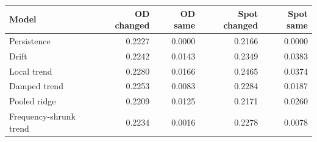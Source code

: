 \begin{tabular}{lrrrr}
\toprule
Model & OD changed & OD same & Spot changed & Spot same \\
\midrule
Persistence & 0.2227 & 0.0000 & 0.2166 & 0.0000 \\
Drift & 0.2242 & 0.0143 & 0.2349 & 0.0383 \\
Local trend & 0.2280 & 0.0166 & 0.2465 & 0.0374 \\
Damped trend & 0.2253 & 0.0083 & 0.2284 & 0.0187 \\
Pooled ridge & 0.2209 & 0.0125 & 0.2171 & 0.0260 \\
Frequency-shrunk trend & 0.2234 & 0.0016 & 0.2278 & 0.0078 \\
\bottomrule
\end{tabular}
